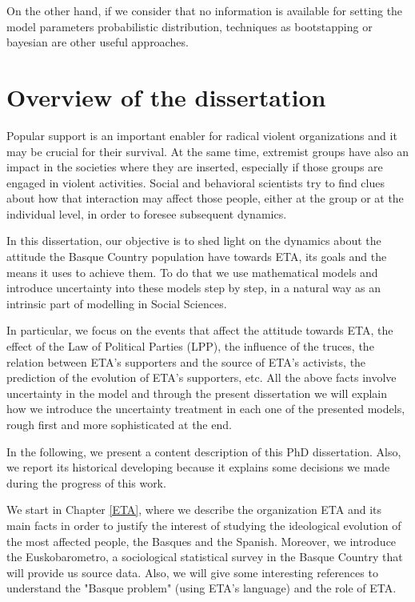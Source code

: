 On the other hand, if we consider that no information is available for setting the model parameters probabilistic distribution, techniques as bootstapping \cite{almu, NOS} or bayesian \cite{bay} are other useful approaches. 

\section{Overview of the dissertation}
Popular support is an important enabler for radical violent organizations and it may be crucial for their survival. At the same time, extremist groups have also an impact in the societies where they are inserted, especially if those groups are engaged in violent activities. Social and behavioral scientists try to find clues about how that interaction may affect those people, either at the group or at the individual level, in order to foresee subsequent dynamics. 

In this dissertation, our objective is to shed light on the dynamics about the attitude the Basque Country population have towards ETA, its goals and the means it uses to achieve them. To do that we use mathematical models and introduce uncertainty into these models step by step, in a natural way as an intrinsic part of modelling in Social Sciences. 

In particular, we focus on the events that affect the attitude towards ETA, the effect of the Law of Political Parties (LPP), the influence of the truces, the relation between ETA's supporters and the source of ETA's activists, the prediction of the evolution of ETA's supporters, etc. All the above facts involve uncertainty in the model and through the present dissertation we will explain how we introduce the uncertainty treatment in each one of the presented models, rough first and more sophisticated at the end.  

In the following, we present a content description of this PhD dissertation. Also, we report its historical developing because it explains some decisions we made during the progress of this work.
 
We start in Chapter \ref{ETA}, where we describe the organization ETA and its main facts in order to justify the interest of studying the ideological evolution of the most affected people, the Basques and the Spanish. Moreover, we introduce the Euskobarometro, a sociological statistical survey in the Basque Country that will provide us source data. Also, we will give some interesting references to understand the "Basque problem" (using ETA's language) and the role of ETA. 


